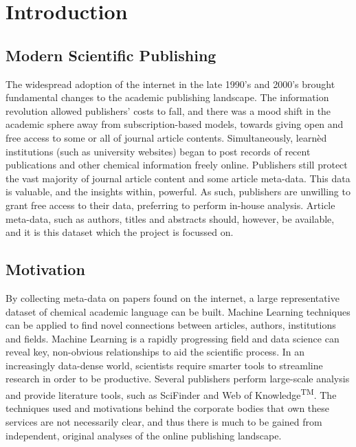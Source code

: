 \chapter{Introduction}
\addtocounter{page}{1}

\section{Modern Scientific Publishing}
The widespread adoption of the internet in the late 1990’s and 2000’s brought  fundamental changes to the academic publishing landscape. The information revolution allowed publishers' costs to fall, and there was a mood shift in the academic sphere away from subscription-based models, towards giving open and free access to some or all of journal article contents.
Simultaneously, learn\`{e}d institutions (such as university websites) began to post records of recent publications and other chemical information freely online. 
Publishers still protect the vast majority of journal article content and some article meta-data. This data is valuable, and the insights within, powerful. As such, publishers are unwilling to grant free access to their data, preferring to perform in-house analysis. Article meta-data, such as authors, titles and abstracts should, however, be available, and it is this dataset which the project is focussed on. 
\section{Motivation}
By collecting meta-data on papers found on the internet, a large representative dataset of chemical academic  language can be built. Machine Learning techniques can be applied to find novel connections between articles, authors, institutions and fields. Machine Learning is a rapidly progressing field and data science can reveal key, non-obvious relationships to aid the scientific process. In an increasingly data-dense world, scientists require smarter tools to streamline research in order to be productive. Several publishers perform large-scale analysis and provide literature tools, such as SciFinder\textsuperscript{\textregistered} and Web of Knowledge\textsuperscript{TM}. The techniques used and motivations behind the corporate bodies that own these services are not necessarily clear, and thus there is much to be gained from independent, original analyses of the online publishing landscape. 
\newpage

\addtocounter{page}{-2}
\null
\newpage
\addtocounter{page}{1}
\null
\newpage

